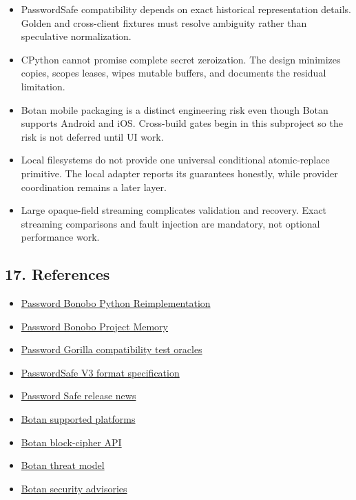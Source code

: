 \documentclass[
  letterpaper,
]{article}
\providecommand{\tightlist}{%
  \setlength{\itemsep}{0pt}\setlength{\parskip}{0pt}}
\begin{document}
\begin{itemize}
\tightlist
\item
  PasswordSafe compatibility depends on exact historical representation details. Golden and cross-client fixtures must
  resolve ambiguity rather than speculative normalization.
\item
  CPython cannot promise complete secret zeroization. The design minimizes copies, scopes leases, wipes mutable buffers,
  and documents the residual limitation.
\item
  Botan mobile packaging is a distinct engineering risk even though Botan supports Android and iOS. Cross-build gates
  begin in this subproject so the risk is not deferred until UI work.
\item
  Local filesystems do not provide one universal conditional atomic-replace primitive. The local adapter reports its
  guarantees honestly, while provider coordination remains a later layer.
\item
  Large opaque-field streaming complicates validation and recovery. Exact streaming comparisons and fault injection are
  mandatory, not optional performance work.
\end{itemize}

\subsection{17. References}\label{17-references}

\begin{itemize}
\tightlist
\item
  \href{../../specs/password-bonobo-python-reimplementation-design.md}{Password Bonobo Python Reimplementation}
\item
  \href{../../PROJECT_MEMORY.md}{Password Bonobo Project Memory}
\item
  \href{../../compatibility/gorilla/test-oracles.md}{Password Gorilla compatibility test oracles}
\item
  \href{https://github.com/pwsafe/pwsafe/blob/master/docs/formatV3.txt}{PasswordSafe V3 format specification}
\item
  \href{https://pwsafe.org/news.shtml}{Password Safe release news}
\item
  \href{https://botan.randombit.net/handbook/support.html}{Botan supported platforms}
\item
  \href{https://botan.randombit.net/handbook/api_ref/block_cipher.html}{Botan block-cipher API}
\item
  \href{https://botan.randombit.net/handbook/threat_model.html}{Botan threat model}
\item
  \href{https://botan.randombit.net/handbook/security.html}{Botan security advisories}
\end{itemize}
\end{document}
